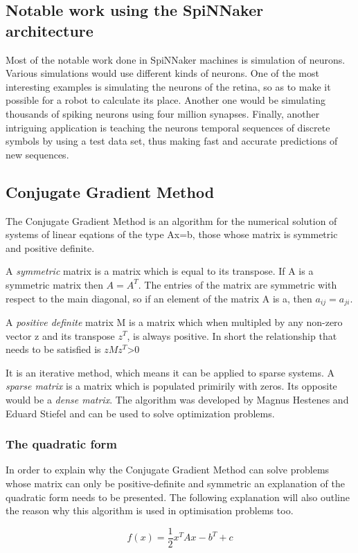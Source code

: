 \documentclass[12pt,a4paper]{article}
\begin{document}
\subsection{Notable work using the SpiNNaker architecture}
Most of the notable work done in SpiNNaker machines is simulation of neurons. Various simulations would use different kinds of neurons\cite{rast2012event}\cite{rast2011event}\cite{davies2011maintaining}\cite{jin2010algorithm}. One of the most interesting examples is simulating the neurons of the retina, so as to make it possible for a robot to calculate its place\cite{davies2010interfacing}. Another one would be simulating thousands of spiking neurons using four million synapses\cite{sharp2012power}. Finally, another intriguing application is teaching the neurons temporal sequences  of discrete symbols by using a test data set, thus making fast and accurate predictions of new sequences\cite{bose2005spiking}.

\subsection{Conjugate Gradient Method}
The Conjugate Gradient Method is an algorithm for the numerical solution of systems of linear eqations of the type Ax=b, those whose matrix is symmetric and positive definite. 

A \emph{symmetric} matrix is a matrix which is equal to its transpose. If A is a symmetric matrix then $A=A^T$. The entries of the matrix are symmetric with respect to the main diagonal, so if an element of the matrix A is a, then $a_{ij}=a_{ji}$. 

A \emph{positive definite} matrix M is a matrix which when multipled by any non-zero vector z and its transpose $z^T$, is always positive. In short the relationship that needs to be satisfied is $zMz^T$>0

It is an iterative method, which means it can be applied to sparse systems. A \emph{sparse matrix} is a matrix which is populated primirily with zeros. Its opposite would be a \emph{dense matrix}. The algorithm was developed by Magnus Hestenes and Eduard Stiefel and can be used to solve optimization problems\cite{press2007numerical}.
\subsubsection{The quadratic form}
In order to explain why the Conjugate Gradient Method can solve problems whose matrix can only be positive-definite and symmetric an explanation of the quadratic form needs to be presented. The following explanation will also outline the reason why this algorithm is used in optimisation problems too.
\begin{center}
\begin{equation}
f(x)=\frac{1}{2}x^TAx-b^T+c
\end{equation}
\end{center}
\end{document}
